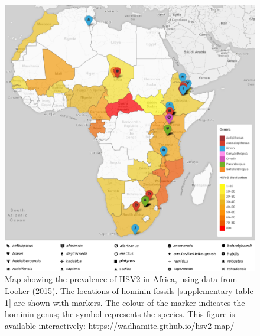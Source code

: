\documentclass[fleqn,10pt]{wlscirep}
\begin{document}
\begin{figure}[!h]
	\centering
	\includegraphics[width=\textwidth]{figs/fossils}
	\caption{Map showing the prevalence of HSV2 in Africa, using data from Looker (2015). The locations of hominin fossils [supplementary table 1] are shown with markers. The colour of the marker indicates the hominin genus; the symbol represents the species. 
		This figure is available interactively: \url{https://wadhamite.github.io/hsv2-map/}}
	\label{fig:hsv2}   
\end{figure}  
\end{document}
